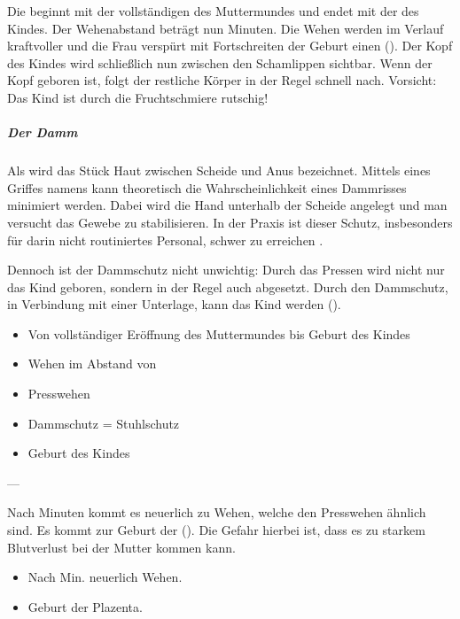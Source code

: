 {%
Die  beginnt mit der
vollständigen  des Muttermundes \Z{(10\CM*)}
und endet mit der  des Kindes.
\cite{BuehlingGynaekologie1,HaagGyn2007}
Der Wehenabstand beträgt nun 
Minuten. Die Wehen werden im Verlauf kraftvoller und die
Frau verspürt mit Fortschreiten der Geburt einen
 (). Der Kopf des Kindes wird
schließlich nun zwischen den Schamlippen  sichtbar.
Wenn der Kopf geboren ist, folgt der restliche Körper in der
Regel schnell nach. Vorsicht: Das Kind ist durch die
Fruchtschmiere rutschig!

\subparagraph{Der Damm}
\label{topic:dammschutz}
Als  wird das Stück Haut zwischen Scheide und Anus
bezeichnet. Mittels eines
Griffes namens  kann
theoretisch die Wahrscheinlichkeit eines Dammrisses
minimiert werden. Dabei wird die Hand unterhalb der
Scheide angelegt und man versucht das Gewebe zu
stabilisieren. In der Praxis ist dieser Schutz, insbesonders
für darin nicht routiniertes Personal, schwer zu erreichen
\cite{AsboeLehrmeinungRd2011-20}.

Dennoch ist der Dammschutz nicht unwichtig: Durch das
Pressen wird nicht nur das Kind geboren, sondern in der
Regel auch   abgesetzt. Durch den Dammschutz, in
Verbindung mit einer Unterlage, kann das Kind  werden ().

}{%
\begin{itemize}
  \item Von vollständiger Eröffnung des Muttermundes bis
  Geburt des Kindes
  \item Wehen im Abstand von \Min*
  \item Presswehen
  \item Dammschutz = Stuhlschutz
  \item Geburt des Kindes
\end{itemize}
}
{}
{}
{---}






{%
Nach  Minuten kommt es neuerlich zu Wehen,
welche den Presswehen ähnlich sind. Es kommt zur Geburt der
 (). Die Gefahr hierbei ist,
dass es zu starkem Blutverlust bei der Mutter kommen kann.
}{
\begin{itemize}  
    \item Nach  Min. neuerlich Wehen. 
    \item Geburt der Plazenta.
\end{itemize}
}{}{}{}



